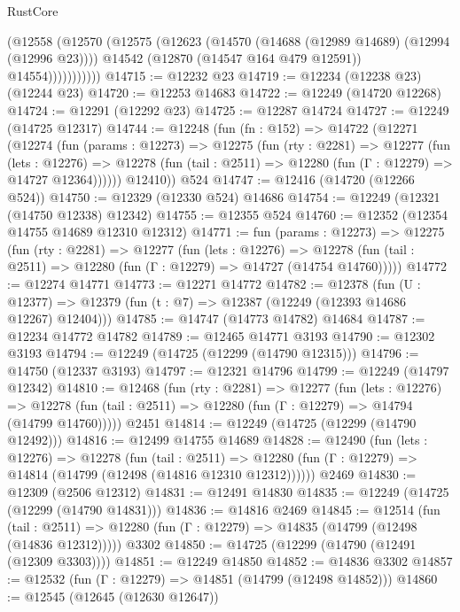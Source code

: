 \begin{lexlean}{RustCore}
\begin{coremodule}
                  (@12558
                    (@12570
                      (@12575
                        (@12623
                          (@14570 (@14688 (@12989 @14689) (@12994 (@12996 @23))))
                          @14542
                          (@12870 (@14547 @164 @479 @12591))
                          @14554)))))))))))
@14715 := @12232 @23
@14719 := @12234 (@12238 @23) (@12244 @23)
@14720 := @12253 @14683
@14722 := @12249 (@14720 @12268)
@14724 := @12291 (@12292 @23)
@14725 := @12287 @14724
@14727 := @12249 (@14725 @12317)
@14744 := @12248
    (fun (fn : @152) =>
    @14722
      (@12271
        (@12274
          (fun (params : @12273) =>
          @12275
            (fun (rty : @2281) =>
            @12277
              (fun (lets : @12276) =>
              @12278 (fun (tail : @2511) => @12280 (fun (Γ : @12279) => @14727 @12364))))))
        @12410))
    @524
@14747 := @12416 (@14720 (@12266 @524))
@14750 := @12329 (@12330 @524) @14686
@14754 := @12249 (@12321 (@14750 @12338) @12342)
@14755 := @12355 @524
@14760 := @12352 (@12354 @14755 @14689 @12310 @12312)
@14771 := fun (params : @12273) =>
  @12275
    (fun (rty : @2281) =>
    @12277
      (fun (lets : @12276) =>
      @12278 (fun (tail : @2511) => @12280 (fun (Γ : @12279) => @14727 (@14754 @14760)))))
@14772 := @12274 @14771
@14773 := @12271 @14772
@14782 := @12378
    (fun (U : @12377) => @12379 (fun (t : @7) => @12387 (@12249 (@12393 @14686 @12267) @12404)))
@14785 := @14747 (@14773 @14782) @14684
@14787 := @12234 @14772 @14782
@14789 := @12465 @14771 @3193
@14790 := @12302 @3193
@14794 := @12249 (@14725 (@12299 (@14790 @12315)))
@14796 := @14750 (@12337 @3193)
@14797 := @12321 @14796
@14799 := @12249 (@14797 @12342)
@14810 := @12468
    (fun (rty : @2281) =>
    @12277
      (fun (lets : @12276) =>
      @12278 (fun (tail : @2511) => @12280 (fun (Γ : @12279) => @14794 (@14799 @14760)))))
    @2451
@14814 := @12249 (@14725 (@12299 (@14790 @12492)))
@14816 := @12499 @14755 @14689
@14828 := @12490
    (fun (lets : @12276) =>
    @12278
      (fun (tail : @2511) =>
      @12280 (fun (Γ : @12279) => @14814 (@14799 (@12498 (@14816 @12310 @12312))))))
    @2469
@14830 := @12309 (@2506 @12312)
@14831 := @12491 @14830
@14835 := @12249 (@14725 (@12299 (@14790 @14831)))
@14836 := @14816 @2469
@14845 := @12514
    (fun (tail : @2511) => @12280 (fun (Γ : @12279) => @14835 (@14799 (@12498 (@14836 @12312)))))
    @3302
@14850 := @14725 (@12299 (@14790 (@12491 (@12309 @3303))))
@14851 := @12249 @14850
@14852 := @14836 @3302
@14857 := @12532 (fun (Γ : @12279) => @14851 (@14799 (@12498 @14852)))
@14860 := @12545 (@12645 (@12630 @12647))

\end{coremodule}
\end{lexlean}

